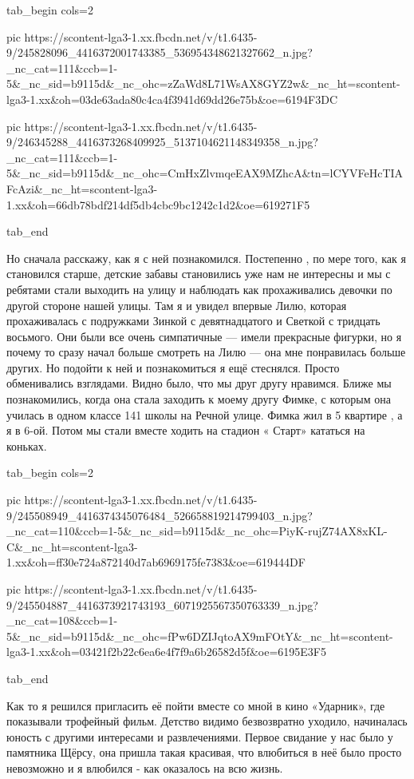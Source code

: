 \ifcmt
  tab_begin cols=2

     pic https://scontent-lga3-1.xx.fbcdn.net/v/t1.6435-9/245828096_4416372001743385_536954348621327662_n.jpg?_nc_cat=111&ccb=1-5&_nc_sid=b9115d&_nc_ohc=zZaWd8L71WsAX8GYZ2w&_nc_ht=scontent-lga3-1.xx&oh=03de63ada80c4ca4f3941d69dd26e75b&oe=6194F3DC

     pic https://scontent-lga3-1.xx.fbcdn.net/v/t1.6435-9/246345288_4416373268409925_5137104621148349358_n.jpg?_nc_cat=111&ccb=1-5&_nc_sid=b9115d&_nc_ohc=CmHxZlvmqeEAX9MZhcA&tn=lCYVFeHcTIAFcAzi&_nc_ht=scontent-lga3-1.xx&oh=66db78bdf214df5db4cbc9bc1242c1d2&oe=619271F5

  tab_end
\fi

Но сначала расскажу, как я с ней познакомился. Постепенно , по мере того, как я
становился  старше, детские забавы становились уже нам не интересны и мы с
ребятами стали выходить на улицу и наблюдать как  прохаживались девочки по
другой стороне нашей улицы. Там я и увидел впервые Лилю, которая прохаживалась
с подружками Зинкой с девятнадцатого  и Светкой с  тридцать восьмого. Они были
все очень симпатичные — имели прекрасные фигурки, но  я почему то сразу начал
больше смотреть на Лилю — она мне понравилась  больше других. Но подойти к ней
и познакомиться я  ещё стеснялся. Просто обменивались взглядами. Видно было,
что мы друг другу нравимся.  Ближе мы познакомились, когда она стала заходить к
моему другу  Фимке, с которым она училась в одном классе 141 школы на Речной
улице. Фимка жил в 5 квартире , а я в 6-ой.   Потом мы стали вместе ходить на
стадион « Старт» кататься на коньках. 

\ifcmt
  tab_begin cols=2

     pic https://scontent-lga3-1.xx.fbcdn.net/v/t1.6435-9/245508949_4416374345076484_526658819214799403_n.jpg?_nc_cat=110&ccb=1-5&_nc_sid=b9115d&_nc_ohc=PiyK-rujZ74AX8xKL-C&_nc_ht=scontent-lga3-1.xx&oh=ff30e724a872140d7ab6969175fe7383&oe=619444DF

     pic https://scontent-lga3-1.xx.fbcdn.net/v/t1.6435-9/245504887_4416373921743193_6071925567350763339_n.jpg?_nc_cat=108&ccb=1-5&_nc_sid=b9115d&_nc_ohc=fPw6DZIJqtoAX9mFOtY&_nc_ht=scontent-lga3-1.xx&oh=03421f2b22c6ea6e4f7f9a6b26582d5f&oe=6195E3F5

  tab_end
\fi

Как то я решился пригласить её пойти вместе со мной в кино «Ударник», где
показывали трофейный фильм.  Детство видимо безвозвратно уходило, начиналась
юность с другими интересами и развлечениями. Первое свидание у нас было у
памятника Щёрсу, она пришла такая красивая, что влюбиться в неё было просто
невозможно и я влюбился - как оказалось на всю жизнь.

